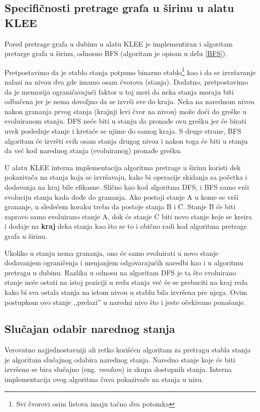 \documentclass[12pt,oneside]{memoir}
\begin{document}
\subsection{Specifičnosti pretrage grafa u širinu u alatu KLEE} 
Pored pretrage grafa u dubinu u alatu KLEE je implementiran i algoritam pretarge grafa u širinu, odnosno BFS (algoritam je opisan u delu \ref{BFS}).

Pretpostavimo da je stablo stanja potpuno binarno stablo\footnote[4]{Svi čvorovi osim listova imaju tačno dva potomka} kao i da se izvršavanje nalazi na nivou dva gde imamo osam čvorova (stanja). Dodatno, pretpostavimo da je memorija ograničavajući faktor u toj meri da neka stanja moraju biti odbačena jer je nema dovoljno da se izvrši sve do kraja. Neka na narednom nivou nakon grananja prvog stanja (krajnji levi čvor na nivou) može doći do greške u evoluiranom stanju. DFS neće biti u stanju da pronađe ovu grešku jer će birati uvek poslednje stanje i kretaće se njime do samog kraja. S druge strane, BFS algoritam će izvršti svih osam stanja drugog nivoa i nakon toga će biti u stanju da već kod narednog stanja (evoluiranog) pronađe grešku. 

U alatu KLEE interna implementacija algoritma pretrage u širinu koristi dek pokazivača na stanja koja se izvršavaju, kako bi operacije skidanja sa početka i dodavanja na kraj bile efikasne. Slično kao kod algoritma DFS, i BFS samo vrši evoluciju stanja kada dođe do grananja. Ako postoji stanje A u kome se vrši grananje, u sledećem koraku treba da postoje stanja B i C. Stanje B će biti zapravo samo evoluirano stanje A, dok će stanje C biti novo stanje koje se kreira i dodaje na \textbf{kraj} deka stanja kao što se to i obično radi kod algoritma pretrage grafa u širinu. 

Ukoliko u stanju nema grananja, ono će samo evoluirati u novo stanje dodavanjem ograničenja i menjanjem odgovarajućih naredbi kao i u algoritmu pretragu u dubinu. Razlika u odnosu na algoritam DFS je ta što evoluirano stanje neće ostati na istoj poziciji u redu stanja već će se prebaciti na kraj reda kako bi sva ostala stanja na istom nivou u stablu bila izvršena pre njega. Ovim postupkom ovo stanje ,,prelazi'' u naredni nivo što i jeste očekivano ponašanje. 

\subsection{Slučajan odabir narednog stanja} 
Verovatno najjednostavniji ali retko korišćen algoritam za pretragu stabla stanja je algoritam slučajnog odabira narednog stanja. Naredno stanje koje će biti izvršeno se bira slučajno (eng. \textit{random}) iz skupa dostupnih stanja. Interna implementacija ovog algoritma čuva pokazivače na stanja u nizu. 
\end{document}
